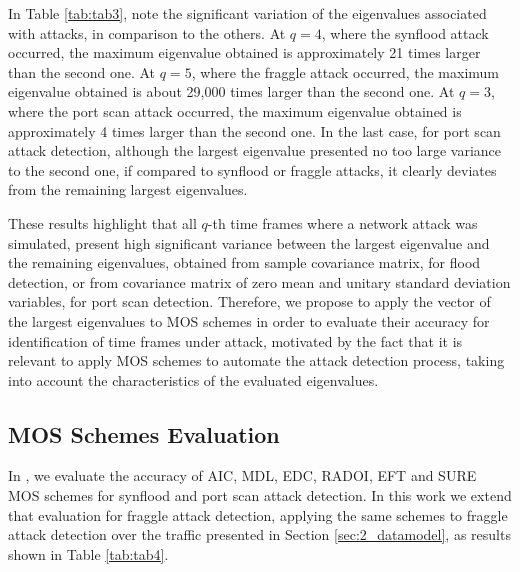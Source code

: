 In Table \ref{tab:tab3}, note the significant variation of the eigenvalues associated with attacks, in comparison to the others. At $q = 4$, where the synflood attack occurred, the maximum eigenvalue obtained is approximately 21 times larger than the second one. At $q = 5$, where the fraggle attack occurred, the maximum eigenvalue obtained is about 29,000 times larger than the second one. At $q = 3$, where the port scan attack occurred, the maximum eigenvalue obtained is approximately 4 times larger than the second one. In the last case, for port scan attack detection, although the largest eigenvalue presented no too large variance to the second one, if compared to synflood or fraggle attacks, it clearly deviates from the remaining largest eigenvalues.

These results highlight that all $q$-th time frames where a network attack was simulated, present high significant variance between the largest eigenvalue and the remaining eigenvalues, obtained from sample covariance matrix, for flood detection, or from covariance matrix of zero mean and unitary standard deviation variables, for port scan detection. Therefore, we propose to apply the vector of the largest eigenvalues to MOS schemes in order to evaluate their accuracy for identification of time frames under attack, motivated by the fact that it is relevant to apply MOS schemes to automate the attack detection process, taking into account the characteristics of the evaluated eigenvalues.

\subsection{MOS Schemes Evaluation}
\label{sec:2_MOSSchemesEvaluation}

In \cite{tenorio2013greatest}, we evaluate the accuracy of AIC, MDL, EDC, RADOI, EFT and SURE MOS schemes \cite{da2009comparison,tenorio2013greatest} for synflood and port scan attack detection. In this work we extend that evaluation for fraggle attack detection, applying the same schemes to fraggle attack detection over the traffic presented in Section \ref{sec:2_datamodel}, as results shown in Table \ref{tab:tab4}.

